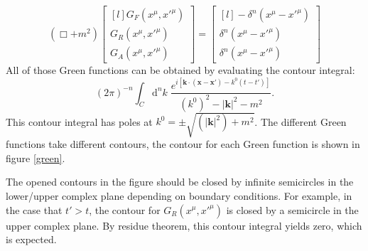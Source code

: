 \documentclass[12pt]{article}
\numberwithin{equation}{subsection}
\theoremstyle{mystyle}{\newtheorem{definition}{Definition}[subsection]}
\theoremstyle{mystyle}{\newtheorem{theorem}[definition]{Theorem}}
\theoremstyle{mystyle}{\newtheorem*{remark}{Remark}}
\theoremstyle{mystyle}{\newtheorem{example}{Example}[subsection]}
\theoremstyle{mystyle}{\newtheorem{examples}{Examples}[subsection]}
\theoremstyle{mystyle}{\newtheorem{cthm}{}[subsection]}
\newcommand{\id}{\mathrm{d}}
\begin{document}
\begin{equation}
  (\Box+m^2)
  \begin{bmatrix*}[l]
    G_{F}(x^{\mu},x'^{\mu})\\
    G_{R}(x^{\mu},x'^{\mu})\\
    G_{A}(x^{\mu},x'^{\mu})
  \end{bmatrix*}
  =
  \begin{bmatrix*}[l]
    -\delta^n(x^{\mu}-x'^{\mu})\\
    \delta^n(x^{\mu}-x'^{\mu})\\
    \delta^n(x^{\mu}-x'^{\mu})
  \end{bmatrix*}
\end{equation}
All of those Green functions can be obtained by evaluating the contour integral:
\begin{equation}
  (2\pi)^{-n}\int_{C}\id^nk\;\frac{e^{i\left[\mathbf{k}\cdot(\mathbf{x}-\mathbf{x'})-k^0(t-t')\right]}}{(k^0)^2-|\mathbf{k}|^2-m^2}.
\end{equation}
This contour integral has poles at \(k^0=\pm \sqrt{(|\mathbf{k}|^2)+m^2}\).
The different Green functions take different contours, the contour for each Green function is shown in figure \ref{green}.

The opened contours in the figure should be closed by infinite semicircles in the lower/upper complex plane depending on boundary conditions.
For example, in the case that \(t'>t\), the contour for \(G_{R}(x^{\mu},x'^{\mu})\) is closed by a semicircle in the upper complex plane.
By residue theorem, this contour integral yields zero, which is expected.
\end{document}
